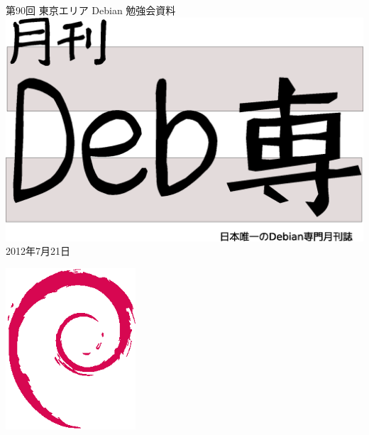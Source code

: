 \documentclass[mingoth,a4paper]{jsarticle}
\newcommand{\debmtgyear}{2012}
\newcommand{\debmtgmonth}{7}
\newcommand{\debmtgdate}{21}
\newcommand{\debmtgnumber}{90}
\begin{document}
\begin{titlepage}
\thispagestyle{empty}

\vspace*{-2cm}
第\debmtgnumber{}回 東京エリア Debian 勉強会資料\\
\hspace*{-2cm}
\includegraphics[width=210mm]{image201003/debsen.eps}\\
\hfill{}\debmtgyear{}年\debmtgmonth{}月\debmtgdate{}日


\vspace*{-2cm}
\hfill{}\includegraphics[height=6cm]{image200502/openlogo-nd.eps}
\end{titlepage}

\end{document}
